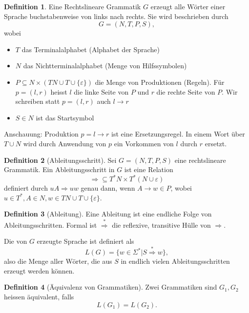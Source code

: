 \documentclass[11pt]{article} %
\theoremstyle{definition}
\newtheorem{definition}{Definition}
\begin{document}
\begin{definition}
Eine Rechtslineare Grammatik $G$ erzeugt alle Wörter einer Sprache buchstabenweise von links nach rechts. Sie wird beschrieben durch
\[
G = (N,T,P,S),
\]
wobei
\begin{itemize}
\item $T$ das Terminalalphabet (Alphabet der Sprache)
\item $N$ das Nichtterminalalphabet (Menge von Hilfssymbolen)
\item $P \subseteq N \times (TN \cup T \cup \{\varepsilon\})$ die Menge von Produktionen (Regeln). Für $p = (l,r)$ heisst $l$ die linke Seite von $P$ und $r$ die rechte Seite von $P$. Wir schreiben statt $p = (l,r)$ auch $l \rightarrow r$
\item $S \in N$ ist das Startsymbol
\end{itemize}
\end{definition}

Anschauung: Produktion $p = l \rightarrow r$ ist eine Ersetzungsregel. In einem Wort über $T\cup N$ wird durch Anwendung von $p$ ein Vorkommen von $l$ durch $r$ ersetzt.

\begin{definition}[Ableitungsschritt]
Sei $G = (N,T,P,S)$ eine rechtslineare Grammatik. Ein Ableitungsschritt in $G$ ist eine Relation
\[
\Rightarrow \subseteq T^*N\times T^* (N\cup \varepsilon)
\]
definiert durch $uA \Rightarrow uw$ genau dann, wenn $A \rightarrow w \in P$, wobei $u \in T^*, A\in N, w \in TN \cup T\cup \{\varepsilon\}$.
\end{definition}

\begin{definition}[Ableitung]
Eine Ableitung ist eine endliche Folge von Ableitungsschritten. Formal ist $\overset{*}{\Rightarrow}$ die reflexive, transitive Hülle von $\Rightarrow$.

Die von $G$ erzeugte Sprache ist definiert als
\[
L(G) =  \{w \in \Sigma^* | S \overset{*}{\Rightarrow} w \},
\]
also die Menge aller Wörter, die aus $S$ in endlich vielen Ableitungsschritten erzeugt werden können.

\end{definition}

\begin{definition}[Äquivalenz von Grammatiken]
Zwei Grammatiken sind $G_1, G_2$ heissen äquivalent, falls
\[
L(G_1) = L(G_2).
\]

\end{definition}
\end{document}
